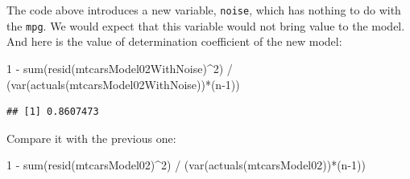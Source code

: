 \documentclass[
]{book}
\newenvironment{Shaded}{\begin{snugshade}}{\end{snugshade}}
\newcommand{\AttributeTok}[1]{\textcolor[rgb]{0.77,0.63,0.00}{#1}}
\newcommand{\CommentTok}[1]{\textcolor[rgb]{0.56,0.35,0.01}{\textit{#1}}}
\newcommand{\DecValTok}[1]{\textcolor[rgb]{0.00,0.00,0.81}{#1}}
\newcommand{\FunctionTok}[1]{\textcolor[rgb]{0.00,0.00,0.00}{#1}}
\newcommand{\NormalTok}[1]{#1}
\newcommand{\OtherTok}[1]{\textcolor[rgb]{0.56,0.35,0.01}{#1}}
\newcommand{\SpecialCharTok}[1]{\textcolor[rgb]{0.00,0.00,0.00}{#1}}
\newcommand{\StringTok}[1]{\textcolor[rgb]{0.31,0.60,0.02}{#1}}
\theoremstyle{definition}
\theoremstyle{definition}
\theoremstyle{definition}
\theoremstyle{definition}
\theoremstyle{remark}
\begin{document}
\begin{Shaded}
\end{Shaded}

The code above introduces a new variable, \texttt{noise}, which has nothing to do with the \texttt{mpg}. We would expect that this variable would not bring value to the model. And here is the value of determination coefficient of the new model:

\begin{Shaded}
\begin{Highlighting}[]
\DecValTok{1} \SpecialCharTok{{-}} \FunctionTok{sum}\NormalTok{(}\FunctionTok{resid}\NormalTok{(mtcarsModel02WithNoise)}\SpecialCharTok{\^{}}\DecValTok{2}\NormalTok{) }\SpecialCharTok{/}
\NormalTok{    (}\FunctionTok{var}\NormalTok{(}\FunctionTok{actuals}\NormalTok{(mtcarsModel02WithNoise))}\SpecialCharTok{*}\NormalTok{(n}\DecValTok{{-}1}\NormalTok{))}
\end{Highlighting}
\end{Shaded}

\begin{verbatim}
## [1] 0.8607473
\end{verbatim}

Compare it with the previous one:

\begin{Shaded}
\begin{Highlighting}[]
\DecValTok{1} \SpecialCharTok{{-}} \FunctionTok{sum}\NormalTok{(}\FunctionTok{resid}\NormalTok{(mtcarsModel02)}\SpecialCharTok{\^{}}\DecValTok{2}\NormalTok{) }\SpecialCharTok{/}
\NormalTok{    (}\FunctionTok{var}\NormalTok{(}\FunctionTok{actuals}\NormalTok{(mtcarsModel02))}\SpecialCharTok{*}\NormalTok{(n}\DecValTok{{-}1}\NormalTok{))}
\end{Highlighting}
\end{Shaded}
\end{document}
